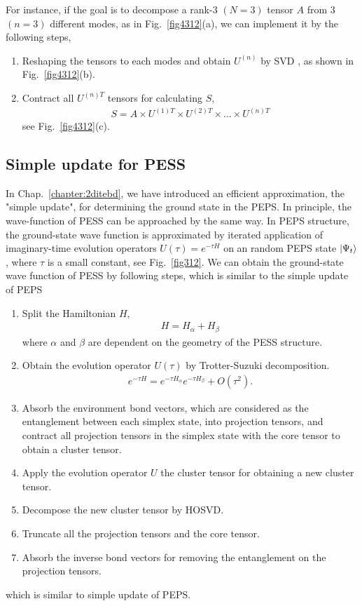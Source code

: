 For instance, if the goal is to decompose a rank-3 $(N=3)$ tensor $A$ from 3 $(n=3)$ different modes, as in Fig.~\ref{fig4312}(a), we can implement it by the following steps, 
\begin{enumerate}
	\item	Reshaping the tensors to each modes and obtain $U^{(n)}$ by SVD , as shown in Fig.~\ref{fig4312}(b).
	\item	Contract all $U^{(n)T}$ tensors for calculating $S$, 
		\begin{align}
			S = A \times U^{(1)T} \times U^{(2)T} \times \dots \times U^{(n)T}
		\end{align} 
		see Fig.~\ref{fig4312}(c).
\end{enumerate}
\subsection{Simple update for PESS}
In Chap.~\ref{chapter:2ditebd}, we have introduced an efficient approximation, the "simple update", for determining the ground state in the PEPS. In principle, the wave-function of PESS can be approached by the same way. In PEPS structure, the ground-state wave function is approximated by iterated application of imaginary-time evolution operators $U(\tau) = e^{-\tau H}$ on an random PEPS state $\Ket{\Psi_t}$, where $\tau$ is a small constant, see Fig.~\ref{fig312}. We can obtain the ground-state wave function of PESS by following steps, which is similar to the simple update of PEPS
\begin{enumerate}
	\item Split the Hamiltonian $H$,  
		\begin{align}
			\label{splitH}
			H = H_{\alpha} + H_{\beta}
		\end{align}
		where $\alpha$ and $\beta$ are dependent on the geometry of the PESS structure.
	\item Obtain the evolution operator $U(\tau)$ by Trotter-Suzuki decomposition.
		\begin{align}
			e^{-\tau H} = e^{-\tau H_{\alpha}} e^{-\tau H_{\beta}} + O(\tau^{2}).
		\end{align}
	\item Absorb the environment bond vectors, which are considered as the entanglement between each simplex state, into projection tensors, and contract all projection tensors in the simplex state with the core tensor to obtain a cluster tensor.
	\item Apply the evolution operator $U$ the cluster tensor for obtaining a new cluster tensor.
	\item Decompose the new cluster tensor by HOSVD.
	\item Truncate all the projection tensors and the core tensor.
	\item Absorb the inverse bond vectors for removing the entanglement on the projection tensors.
\end{enumerate}
which is similar to simple update of PEPS.


